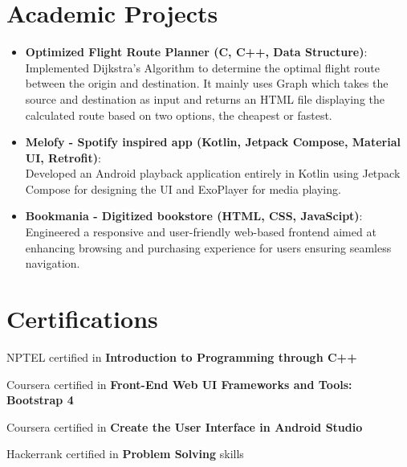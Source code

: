 \documentclass[a4paper,20pt]{article}
\newcommand{\resumeItem}[2]{
  \item\small{
    \textbf{#1}{: #2 \vspace{-2pt}}
  }
}
\newcommand{\resumeSubItem}[2]{\resumeItem{#1}{#2}\vspace{-3pt}}
\newcommand{\resumeSubHeadingListStart}{\begin{itemize}[leftmargin=*]}
\newcommand{\resumeSubHeadingListEnd}{\end{itemize}}
\begin{document}
\section{Academic Projects}
\resumeSubHeadingListStart
\resumeSubItem{Optimized Flight Route Planner (C, C++, Data Structure)}\\
\vspace{5pt}
{Implemented Dijkstra's Algorithm to determine the optimal flight route between the origin and destination. It mainly uses Graph which takes the source and destination as input and returns an HTML file displaying the calculated route based on two options, the cheapest or fastest.}
\vspace{5pt}
\resumeSubItem{Melofy - Spotify inspired app (Kotlin, Jetpack Compose, Material UI, Retrofit)}\\
\vspace{5pt}
{Developed an Android playback application entirely in Kotlin using Jetpack Compose for designing the UI and ExoPlayer for media playing.}
\vspace{5pt}
\resumeSubItem{Bookmania - Digitized bookstore (HTML, CSS, JavaScipt)}\\
\vspace{5pt}
{Engineered a responsive and user-friendly web-based frontend aimed at enhancing browsing and purchasing experience for users ensuring seamless navigation.}
\vspace{5pt}
\resumeSubHeadingListEnd
\vspace{2pt}


\section{Certifications}
\begin{description}[font=$\bullet$]
\item {NPTEL certified in \textbf{Introduction to Programming through C++}}
\vspace{-5pt}
\item {Coursera certified in \textbf{Front-End Web UI Frameworks and Tools: Bootstrap 4}}
\vspace{-5pt}
\item {Coursera certified in \textbf{Create the User Interface in Android Studio}}
\vspace{-5pt}
\item {Hackerrank certified in \textbf{Problem Solving} skills}
\vspace{-5pt}
\end{description}
\vspace{2pt}
\end{document}
